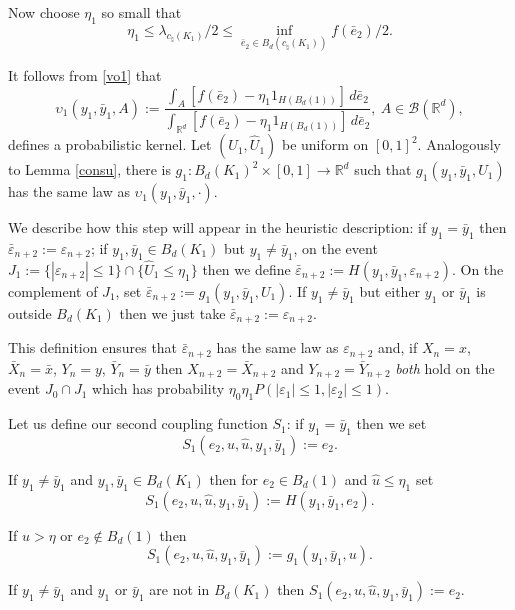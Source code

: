 \documentclass{article}
\begin{document}
Now choose $\eta_1$ so small that
\begin{equation}\label{vo1}
\eta_1\leq \lambda_{c_\natural(K_{1})}/2\leq\inf_{\bar{e}_2\in B_d(c_{\natural}(K_{1}))}f(\bar{e}_2)/2.
\end{equation}

It follows from \eqref{vo1} that $$
\upsilon_1(y_{1},\bar{y}_{1}, A):=\frac{\int_A [f(\bar{e}_2)-\eta_{1}1_{H(B_{d}(1))}]\, d\bar{e}_2}
{\int_{\mathbb{R}^{d}} [f(\bar{e}_2)-\eta_{1}1_{H(B_{d}(1))}]\, d\bar{e}_2},\ A\in\mathcal{B}(\mathbb{R}^{d}),
$$
defines a probabilistic kernel. Let $(U_{1},\hat{U}_{1})$ be uniform on $[0,1]^{2}$. Analogously to Lemma \ref{consu}, there is 
$g_{1}:B_{d}(K_{1})^{2}\times [0,1]\to \mathbb{R}^{d}$
such that $g_{1}(y_{1},\bar{y}_{1},U_{1})$ has the same law as $\upsilon_{1}(y_{1},\bar{y}_{1},\cdot)$.

We describe how this step will appear in the heuristic description: if $y_{1}=\bar{y}_{1}$ then 
$\bar{\varepsilon}_{n+2}:=\varepsilon_{n+2}$;
if $y_1,\bar{y}_1\in B_d(K_{1})$ but $y_{1}\neq \bar{y}_{1}$, on the event
$J_1:=\{|\varepsilon_{n+2}|\leq 1\}\cap \{\hat{U}_1\leq \eta_1\}$ then
we define $\bar{\varepsilon}_{n+2}:=H(y_1,\bar{y}_1,\varepsilon_{n+2})$. On the complement of $J_1$,
set $\bar{\varepsilon}_{n+2}:=g_1(y_1,\bar{y}_1,U_1)$. If $y_{1}\neq \bar{y}_{1}$ but either $y_{1}$ or $\bar{y}_{1}$
is outside $B_d(K_{1})$ then we just take 
$\bar{\varepsilon}_{n+2}:=\varepsilon_{n+2}$.


This definition
ensures that $\bar{\varepsilon}_{n+2}$ has the same law as $\varepsilon_{n+2}$ and,
if $X_n=x$, $\bar{X}_n=\bar{x}$, $Y_n=y$, $\bar{Y}_n=\bar{y}$ then $X_{n+2}=\bar{X}_{n+2}$ and
$Y_{n+2}=\bar{Y}_{n+2}$ \emph{both} hold on the event $J_0\cap J_{1}$ which has probability 
$\eta_0\eta_1 P(|\varepsilon_1|\leq 1,|\varepsilon_2|\leq 1)$.

Let us define our second coupling function $S_{1}$:
if $y_{1}=\bar{y}_{1}$ then we set $$S_{1}(e_2,u,\hat{u},y_{1},\bar{y}_{1}):=e_2.$$ 

If $y_{1}\neq \bar{y}_{1}$ and $y_{1},\bar{y}_{1}\in B_d(K_{1})$ then for $e_2\in B_d(1)$ and
$\hat{u}\leq \eta_{1}$ set
$$S_1(e_2,u,\hat{u},y_{1},\bar{y}_{1}):=H(y_{1},\bar{y}_{1},e_2).$$

If $\hat{u}>\eta$ or $e_{2}\notin B_{d}(1)$ then
$$S_1(e_2,u,\hat{u},y_{1},\bar{y}_{1}):=g_{1}(y_{1},\bar{y}_{1},u).$$

If $y_{1}\neq \bar{y}_{1}$ and $y_{1}$ or $\bar{y}_{1}$ are not in $B_d(K_{1})$ then 
$S_1(e_2,u,\hat{u},y_{1},\bar{y}_{1}):=e_2$.
%
\end{document}
